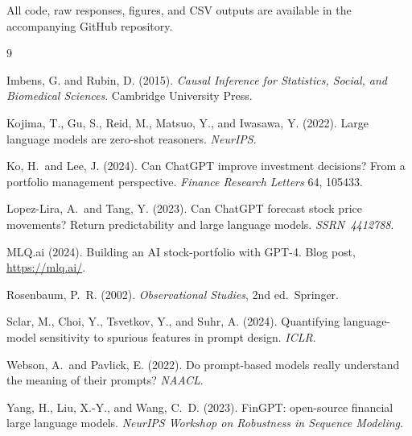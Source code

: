 \documentclass[11pt]{article}
\begin{document}
All code, raw responses, figures, and CSV outputs are available in the
accompanying GitHub repository.

\begin{thebibliography}{9}

Imbens, G. and Rubin, D. (2015). \emph{Causal Inference for Statistics,
Social, and Biomedical Sciences}. Cambridge University Press.

Kojima, T., Gu, S., Reid, M., Matsuo, Y., and Iwasawa, Y. (2022). Large
language models are zero-shot reasoners. \emph{NeurIPS}.

Ko, H.\ and Lee, J. (2024). Can ChatGPT improve investment decisions?
From a portfolio management perspective. \emph{Finance Research Letters}
64, 105433.

Lopez-Lira, A.\ and Tang, Y. (2023). Can ChatGPT forecast stock price
movements? Return predictability and large language models.
\emph{SSRN~4412788}.

MLQ.ai (2024). Building an AI stock-portfolio with GPT-4. Blog post,
\url{https://mlq.ai/}.

Rosenbaum, P.~R. (2002). \emph{Observational Studies}, 2nd ed.\ Springer.

Sclar, M., Choi, Y., Tsvetkov, Y., and Suhr, A. (2024). Quantifying
language-model sensitivity to spurious features in prompt design.
\emph{ICLR}.

Webson, A.\ and Pavlick, E. (2022). Do prompt-based models really
understand the meaning of their prompts? \emph{NAACL}.

Yang, H., Liu, X.-Y., and Wang, C.~D. (2023). FinGPT: open-source
financial large language models. \emph{NeurIPS Workshop on Robustness in
Sequence Modeling}.

\end{thebibliography}
\end{document}
